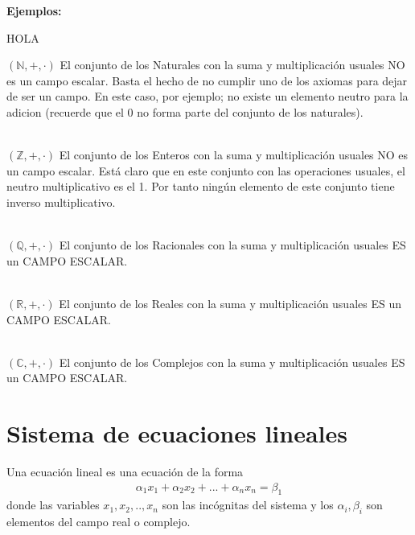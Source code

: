 \textbf{Ejemplos:}


HOLA

$\left( \mathbb{N},+ ,\cdot \right) $
El conjunto de los Naturales con la suma y multiplicación usuales NO es un campo escalar.
Basta el hecho de no cumplir uno de los axiomas para dejar de ser un campo. En este caso, por ejemplo; no existe un elemento neutro para la adicion (recuerde que el 0 no forma parte del conjunto de los naturales).

~\\
$\left( \mathbb{Z},+ ,\cdot \right) $ 
El conjunto de los Enteros con la suma y multiplicación usuales NO es un campo escalar.
Está claro que en este conjunto con las operaciones usuales, el neutro multiplicativo es el 1. Por tanto ningún elemento de este conjunto tiene inverso multiplicativo.

~\\
$\left( \mathbb{Q},+ ,\cdot \right) $ 
El conjunto de los Racionales con la suma y multiplicación usuales ES un CAMPO ESCALAR.

~\\
$\left( \mathbb{R},+ ,\cdot \right) $ 
El conjunto de los Reales con la suma y multiplicación usuales ES un CAMPO ESCALAR.

~\\
$\left( \mathbb{C},+ ,\cdot \right) $ 
El conjunto de los Complejos con la suma y multiplicación usuales ES un CAMPO ESCALAR.


\section{Sistema de ecuaciones lineales}

Una ecuación lineal es una ecuación de la forma
\begin{align*}
\alpha_1 x_1+\alpha_2 x_2+...+\alpha_n x_n=\beta_1
\end{align*} 
donde las variables $x_1, x_2, .., x_n$ son las incógnitas del sistema y los $\alpha_i, \beta_i$ son elementos del campo real o complejo.

